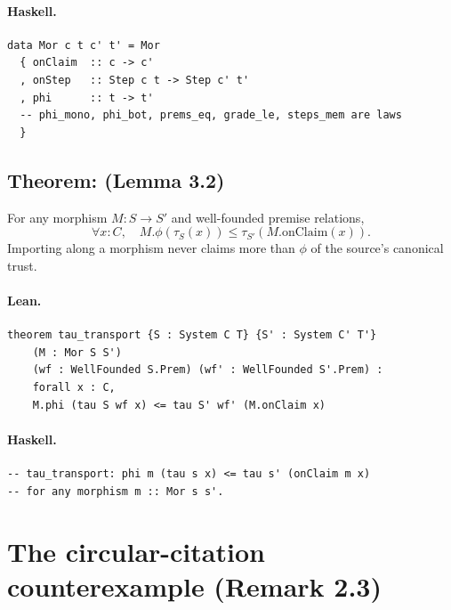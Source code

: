\documentclass[11pt,a4paper]{article}
\begin{document}
\paragraph{Haskell.}
\begin{lstlisting}[style=haskell]
data Mor c t c' t' = Mor
  { onClaim  :: c -> c'
  , onStep   :: Step c t -> Step c' t'
  , phi      :: t -> t'
  -- phi_mono, phi_bot, prems_eq, grade_le, steps_mem are laws
  }
\end{lstlisting}


\subsection{Theorem:  (Lemma 3.2)}

\begin{thm}
For any morphism $M : S \to S'$ and well-founded premise relations,
\[
  \forall x : C,\quad
  M.\phi(\tau_S(x)) \le \tau_{S'}(M.\mathrm{onClaim}(x)).
\]
Importing along a morphism never claims more than $\phi$ of the source's
canonical trust.
\end{thm}

\paragraph{Lean.}
\begin{lstlisting}[style=lean]
theorem tau_transport {S : System C T} {S' : System C' T'}
    (M : Mor S S')
    (wf : WellFounded S.Prem) (wf' : WellFounded S'.Prem) :
    forall x : C,
    M.phi (tau S wf x) <= tau S' wf' (M.onClaim x)
\end{lstlisting}

\paragraph{Haskell.}
\begin{lstlisting}[style=haskell]
-- tau_transport: phi m (tau s x) <= tau s' (onClaim m x)
-- for any morphism m :: Mor s s'.
\end{lstlisting}

\section{The circular-citation counterexample (Remark 2.3)}
\end{document}
